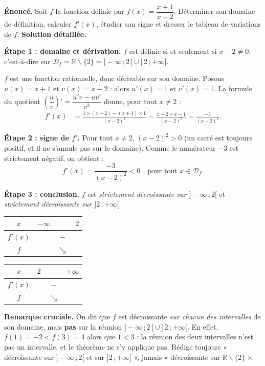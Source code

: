 \documentclass[11pt]{article}
\def\setminus{\mathbin{\backslash}}\let\smallsetminus\setminus
\begin{document}
\begin{exoresolu}[Variations de $f(x) = \dfrac{x+1}{x-2}$]
\textbf{Énoncé.} Soit $f$ la fonction définie par $f(x) = \dfrac{x+1}{x-2}$. Déterminer son domaine de définition, calculer $f'(x)$, étudier son signe et dresser le tableau de variations de $f$.
\tcblower
\textbf{Solution détaillée.}

\textbf{Étape 1 : domaine et dérivation.} $f$ est définie si et seulement si $x - 2 \neq 0$, c'est-à-dire sur $\mathcal{D}_f = \mathbb{R} \setminus \{2\} = ]-\infty\,;2[ \cup ]2\,;+\infty[$.

$f$ est une fonction rationnelle, donc dérivable sur son domaine. Posons $u(x) = x+1$ et $v(x) = x-2$ : alors $u'(x) = 1$ et $v'(x) = 1$. La formule du quotient $\left(\dfrac{u}{v}\right)' = \dfrac{u'v - uv'}{v^2}$ donne, pour tout $x \neq 2$ :
\begin{align*}
f'(x) &= \frac{1 \times (x-2) - (x+1) \times 1}{(x-2)^2} = \frac{x - 2 - x - 1}{(x-2)^2} = \frac{-3}{(x-2)^2}.
\end{align*}

\textbf{Étape 2 : signe de $f'$.} Pour tout $x \neq 2$, $(x-2)^2 > 0$ (un carré est toujours positif, et il ne s'annule pas sur le domaine). Comme le numérateur $-3$ est strictement négatif, on obtient :
\[ f'(x) = \frac{-3}{(x-2)^2} < 0 \quad \text{pour tout } x \in \mathcal{D}_f. \]

\textbf{Étape 3 : conclusion.} $f$ est \emph{strictement décroissante sur $]-\infty\,;2[$} et \emph{strictement décroissante sur $]2\,;+\infty[$}.

\begin{center}
\begin{tabular}{|c|ccc|}\hline
$x$ & $-\infty$ & & $2$ \\ \hline
$f'(x)$ & & $-$ & \\ \hline
$f$ & & $\searrow$ & \\ \hline
\end{tabular}
\quad
\begin{tabular}{|c|ccc|}\hline
$x$ & $2$ & & $+\infty$ \\ \hline
$f'(x)$ & & $-$ & \\ \hline
$f$ & & $\searrow$ & \\ \hline
\end{tabular}
\end{center}

\textbf{Remarque cruciale.} On dit que $f$ est décroissante \emph{sur chacun des intervalles} de son domaine, mais \textbf{pas} sur la réunion $]-\infty\,;2[ \cup ]2\,;+\infty[$. En effet, $f(1) = -2 < f(3) = 4$ alors que $1 < 3$ : la réunion des deux intervalles n'est pas un intervalle, et le théorème ne s'y applique pas. Rédige toujours « décroissante sur $]-\infty\,;2[$ et sur $]2\,;+\infty[$ », jamais « décroissante sur $\mathbb{R}\setminus\{2\}$ ».
\end{exoresolu}
\end{document}
